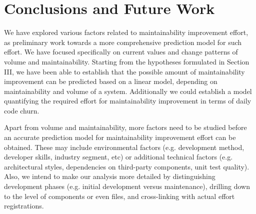 \section{Conclusions and Future Work}
\label{sec:conclusion}
We have explored various factors related to maintainability improvement effort, as preliminary work towards a more comprehensive prediction model for such effort. We have focused specifically on current values and change patterns of volume and maintainability. Starting from the hypotheses formulated in Section III, we have been able to establish that the possible amount of maintainability improvement can be predicted based on a linear model, depending on maintainability and volume of a system. Additionally we could establish a model quantifying the required effort for maintainability improvement in terms of daily code churn.

Apart from volume and maintainability, more factors need to be studied before an accurate prediction model for maintainability improvement effort can be obtained. These may include environmental factors (e.g. development method, developer skills, industry segment, etc) or additional technical factors (e.g. architectural styles, dependencies on third-party components, unit test quality). Also, we intend to make our analysis more detailed by distinguishing development phases (e.g. initial development versus maintenance), drilling down to the level of components or even files, and cross-linking with actual effort registrations.
